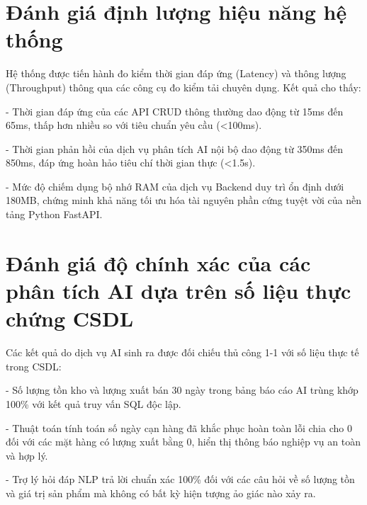 \section{Đánh giá định lượng hiệu năng hệ thống}

Hệ thống được tiến hành đo kiểm thời gian đáp ứng (Latency) và thông lượng (Throughput) thông qua các công cụ đo kiểm tải chuyên dụng. Kết quả cho thấy:

- Thời gian đáp ứng của các API CRUD thông thường dao động từ 15ms đến 65ms, thấp hơn nhiều so với tiêu chuẩn yêu cầu (<100ms).

- Thời gian phản hồi của dịch vụ phân tích AI nội bộ dao động từ 350ms đến 850ms, đáp ứng hoàn hảo tiêu chí thời gian thực (<1.5s).

- Mức độ chiếm dụng bộ nhớ RAM của dịch vụ Backend duy trì ổn định dưới 180MB, chứng minh khả năng tối ưu hóa tài nguyên phần cứng tuyệt vời của nền tảng Python FastAPI.

\section{Đánh giá độ chính xác của các phân tích AI dựa trên số liệu thực chứng CSDL}

Các kết quả do dịch vụ AI sinh ra được đối chiếu thủ công 1-1 với số liệu thực tế trong CSDL:

- Số lượng tồn kho và lượng xuất bán 30 ngày trong bảng báo cáo AI trùng khớp 100\% với kết quả truy vấn SQL độc lập.

- Thuật toán tính toán số ngày cạn hàng đã khắc phục hoàn toàn lỗi chia cho 0 đối với các mặt hàng có lượng xuất bằng 0, hiển thị thông báo nghiệp vụ an toàn và hợp lý.

- Trợ lý hỏi đáp NLP trả lời chuẩn xác 100\% đối với các câu hỏi về số lượng tồn và giá trị sản phẩm mà không có bất kỳ hiện tượng ảo giác nào xảy ra.

